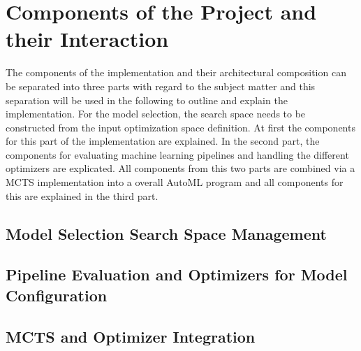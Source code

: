 \section{Components of the Project and their Interaction}
\label{sec:implementation:components}
The components of the implementation and their architectural composition can be separated into three parts with regard to the subject matter and this separation will be used in the following to outline and explain the implementation.
For the model selection, the search space needs to be constructed from the input optimization space definition.
At first the components for this part of the implementation are explained.
In the second part, the components for evaluating machine learning pipelines and handling the different optimizers are explicated.
All components from this two parts are combined via a MCTS implementation into a overall AutoML program and all components for this are explained in the third part.

\subsection{Model Selection Search Space Management}
\label{sec:implementation:components:search-space}
\Blindtext

\subsection{Pipeline Evaluation and Optimizers for Model Configuration}
\label{sec:implementation:components:optimization}
\Blindtext

\subsection{MCTS and Optimizer Integration}
\label{sec:implementation:components:mcts}
\Blindtext

